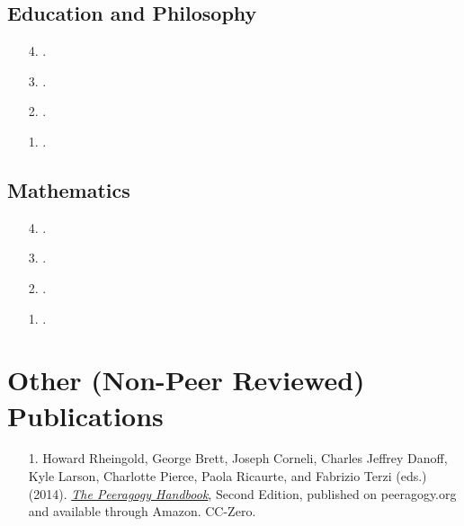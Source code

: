 \documentclass[12pt,article]{memoir}
\begin{document}
\subsection*{Education and Philosophy}

\begin{enumerate}
\item [4.] .\\

\item[3.] . \\

\item[2.] .\\

\item[1.] .\\
\end{enumerate}

\subsection*{Mathematics}

\begin{enumerate}
\item[4.] .\\

\item[3.] .\\

\item[2.] .\\

\item[1.] .\\
\end{enumerate}

\section*{Other (Non-Peer Reviewed) Publications}

\begin{enumerate}
\item[1.] Howard Rheingold, George Brett, Joseph Corneli, Charles Jeffrey Danoff,
Kyle Larson, Charlotte Pierce, Paola Ricaurte, and Fabrizio Terzi (eds.)
(2014). \emph{\href{http://peeragogy.org}{The Peeragogy
    Handbook}}, Second Edition, published on {\ttfamily peeragogy.org} and available through Amazon. CC-Zero.\\
\end{enumerate}
\end{document}
